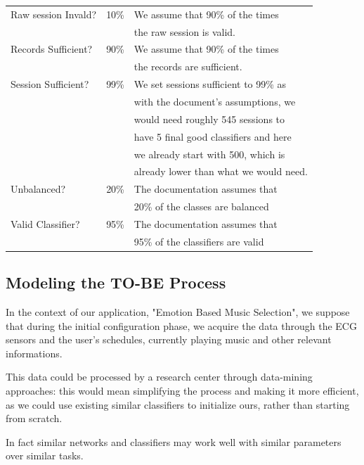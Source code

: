 \begin{table}[H]
\begin{tabularx}{\textwidth}{|X|c|l|}
    \hline
    Raw session Invald? & 10\% & We assume that 90\% of the times
    \\ & & the raw session is valid.\\
    \hline
    Records Sufficient? & 90\% & We assume that 90\% of the times
    \\ & & the records are sufficient.\\
    \hline
    Session Sufficient? & 99\% & We set sessions sufficient to 99\% as
    \\ & & with the document's assumptions, we 
    \\ & & would need roughly 545 sessions to 
    \\ & & have 5 final good classifiers and here
    \\ & &  we already start with 500, which is
    \\ & & already lower than what we would need.\\
    \hline
    Unbalanced? & 20\% & The documentation assumes that
    \\ & &  20\% of the classes are balanced\\
    \hline
    Valid Classifier? & 95\% & The documentation assumes that
    \\ & &  95\% of the classifiers are valid\\
    \hline

\end{tabularx}
\end{table}


\subsection{Modeling the TO-BE Process}
\label{sec:modeling_to_be_processing}

In the context of our application, "Emotion Based Music Selection", we suppose that during the initial configuration phase, we acquire the data through the ECG sensors and the user's schedules, currently playing music and other relevant informations.

This data could be processed by a research center through data-mining approaches: this would mean simplifying the process and making it more efficient, as we could use existing similar classifiers to initialize ours, rather than starting from scratch.

In fact similar networks and classifiers may work well with similar parameters over similar tasks.

